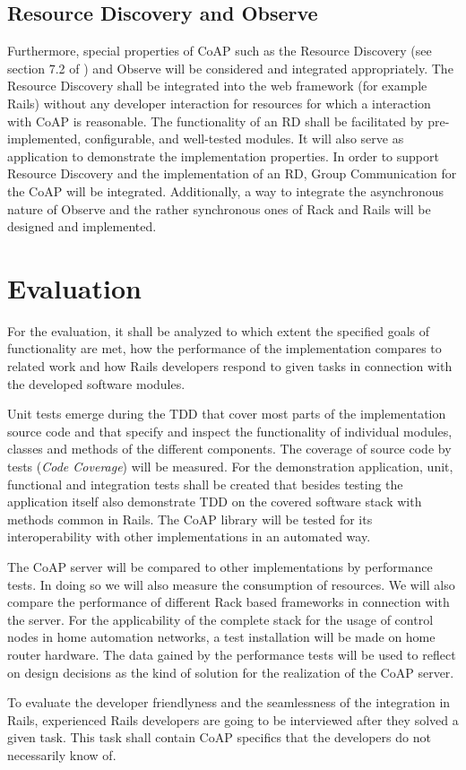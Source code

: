 	\subsection{Resource Discovery and Observe}

		Furthermore, special properties of \ac{CoAP} such as the Resource
		Discovery (see section 7.2 of \cite{coap}) and Observe \cite{observe}
		will be considered and integrated appropriately. The Resource Discovery
		shall be integrated into the web framework (for example \ac{Rails})
		without any developer interaction for resources for which a interaction
		with \ac{CoAP} is reasonable. The functionality of an \ac{RD} \cite{rd}
		shall be facilitated by pre-implemented, configurable, and well-tested
		modules. It will also serve as application to demonstrate the
		implementation properties. In order to support Resource Discovery and
		the implementation of an \ac{RD}, Group Communication for the \ac{CoAP}
		\cite{coap-group} will be integrated. Additionally, a way to integrate
		the asynchronous nature of Observe and the rather synchronous ones of
		Rack and \ac{Rails} will be designed and implemented. 

\section{Evaluation}

	For the evaluation, it shall be analyzed to which extent the specified
	goals of functionality are met, how the performance of the implementation
	compares to related work and how \ac{Rails} developers respond to given
	tasks in connection with the developed software modules.

	Unit tests emerge during the \acf{TDD} that cover most parts of the
	implementation source code and that specify and inspect the functionality
	of individual modules, classes and methods of the different components. The
	coverage of source code by tests (\emph{Code Coverage}) will be measured.
	For the demonstration application, unit, functional and integration tests
	shall be created that besides testing the application itself also
	demonstrate \ac{TDD} on the covered software stack with methods common in
	\ac{Rails}. The \ac{CoAP} library will be tested for its interoperability
	with other implementations in an automated way.

	The \ac{CoAP} server will be compared to other implementations by
	performance tests. In doing so we will also measure the consumption of
	resources. We will also compare the performance of different Rack based
	frameworks in connection with the server. For the applicability of the
	complete stack for the usage of control nodes in home automation networks,
	a test installation will be made on home router hardware. The data gained
	by the performance tests will be used to reflect on design decisions as the
	kind of solution for the realization of the \ac{CoAP} server.

	To evaluate the developer friendlyness and the seamlessness of the
	integration in \ac{Rails}, experienced Rails developers are going to be
	interviewed after they solved a given task. This task shall contain
	\ac{CoAP} specifics that the developers do not necessarily know of.
